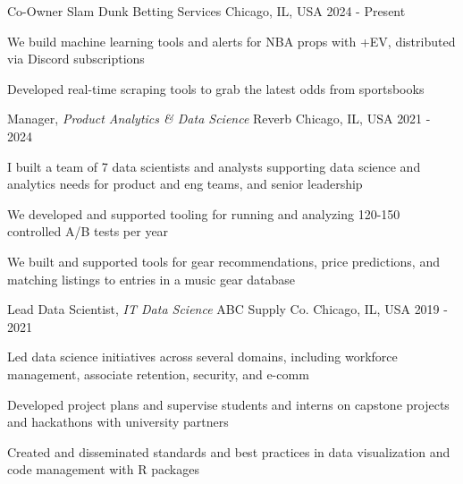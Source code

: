 
\begin{cventries}

  \cventry
    {Co-Owner} %
    {Slam Dunk Betting Services} %
    {Chicago, IL, USA} %
    {2024 - Present} %
    {
      \begin{cvitems}
        \item {We build machine learning tools and alerts for NBA props with +EV, distributed via Discord subscriptions}
        \item {Developed real-time scraping tools to grab the latest odds from sportsbooks}          
      \end{cvitems}
    }

  \cventry
    {Manager, \textit{Product Analytics \& Data Science}} %
    {Reverb} %
    {Chicago, IL, USA} %
    {2021 - 2024} %
    {
      \begin{cvitems}
        \item {I built a team of 7 data scientists and analysts supporting data science and analytics needs for product and eng teams, and senior leadership}
        \item {We developed and supported tooling for running and analyzing 120-150 controlled A/B tests per year}
        \item {We built and supported tools for gear recommendations, price predictions, and matching listings to entries in a music gear database}  
      \end{cvitems}
    }

  \cventry
    {Lead Data Scientist, \textit{IT Data Science}} %
    {ABC Supply Co.} %
    {Chicago, IL, USA} %
    {2019 - 2021} %
    {
      \begin{cvitems}
        \item {Led data science initiatives across several domains, including workforce management, associate retention, security, and e-comm}
        \item {Developed project plans and supervise students and interns on capstone projects and hackathons with university partners}
        \item {Created and disseminated standards and best practices in data visualization and code management with R packages}
      \end{cvitems}
    }


\end{cventries}

